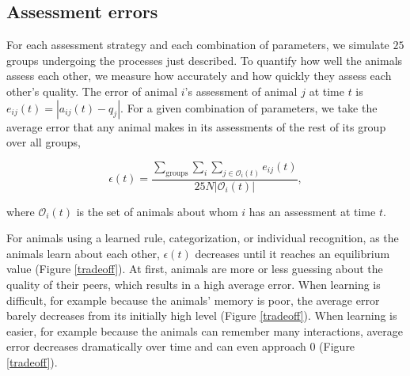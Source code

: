 \subsection{Assessment errors }
For each assessment strategy and each combination of parameters, we simulate $25$ groups undergoing the processes just described.  To quantify how well the animals assess each other, we measure how accurately and how quickly they assess each other's quality. The error of animal $i$'s assessment of animal $j$ at time $t$ is $e_{ij}(t)=|a_{ij}(t)-q_j|$. For a given combination of parameters, we take the average error that any animal makes in its assessments of the rest of its group over all groups, 
\begin{linenomath*}
\begin{equation*}
\epsilon(t) = \frac{\sum_{\text{groups}}\sum_i\sum_{j\in \mathscr{O}_i(t)}e_{ij}(t)}{25N|\mathscr{O}_i(t)|},
\end{equation*}
\end{linenomath*}
where $\mathscr{O}_i(t)$ is the set of animals about whom $i$ has an assessment at time $t$.

For animals using a learned rule, categorization, or individual recognition, as the animals learn about each other, $\epsilon(t)$ decreases until it reaches an equilibrium value (Figure \ref{tradeoff}). At first, animals are more or less guessing about the quality of their peers, which results in a high average error. When learning is difficult, for example because the animals' memory is poor, the average error barely decreases from its initially high level (Figure \ref{tradeoff}). When learning is easier, for example because the animals can remember many interactions, average error decreases dramatically over time and can even approach $0$ (Figure \ref{tradeoff}).  

